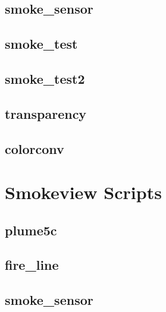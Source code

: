\documentclass[11pt,twoside]{book}
\newcommand{\fdsinput}[1]{
{
\scriptsize

}
}
\begin{document}
\section{smoke\_sensor}
\label{FDSsmokesensor}
\fdsinput{smoke_sensor.fds}

\section{smoke\_test}
\label{FDSsmoketest}
\fdsinput{smoke_test.fds}

\section{smoke\_test2}
\label{FDSsmoketest2}
\fdsinput{smoke_test2.fds}


\section{transparency}
\label{FDStransparency}
\fdsinput{transparency.fds}

\section{colorconv}
\label{FDScolorconv}
\fdsinput{colorconv.fds}

\chapter{Smokeview Scripts}
\label{smvscripts}
\section{plume5c}
\label{SSFplume5c}
\fdsinput{plume5c.ssf}

\section{fire\_line}
\label{SSFfireline}
\fdsinput{fire_line.ssf}

\section{smoke\_sensor}
\label{SSFsmokesensor}
\fdsinput{smoke_sensor.ssf}
\end{document}

